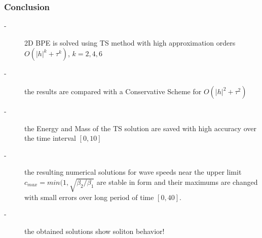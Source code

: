 \documentclass{beamer}
\begin{document}

\begin{frame}
\frametitle{Conclusion}

\begin{description}
 \item[-] 2D BPE is solved using TS method with high approximation orders $O(|h|^k+\tau^k)$, $k=2,4,6$
 \item[-] the results are compared with a Conservative Scheme for $O(|h|^2+\tau^2)$
 \item[-] the Energy and Mass of the TS solution are saved with high accuracy over the time interval $[0, 10]$
 \item[-] the resulting numerical solutions for wave speeds near the upper limit $c_{max} = min(1, \sqrt{\beta_2/\beta_1}$ are stable in form and their maximums are changed with small errors over long period of time $[0, 40]$.
\item[-] the obtained solutions show soliton behavior!
\end{description}

\end{frame}
\end{document}
